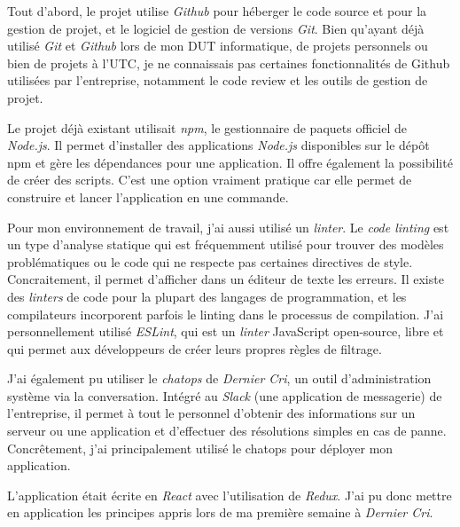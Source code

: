 \bigskip

Tout d'abord, le projet utilise \emph{Github} pour héberger le code
source et pour la gestion de projet, et le logiciel de gestion de
versions \emph{Git}. Bien qu'ayant déjà utilisé \emph{Git} et
\emph{Github} lors de mon DUT informatique, de projets personnels ou
bien de projets à l'UTC, je ne connaissais pas certaines fonctionnalités
de Github utilisées par l'entreprise, notamment le code review et les
outils de gestion de projet.

\bigskip

Le projet déjà existant utilisait \emph{npm}, le gestionnaire de paquets
officiel de \emph{Node.js}. Il permet d'installer des applications
\emph{Node.js} disponibles sur le dépôt npm et gère les dépendances pour
une application. Il offre également la possibilité de créer des scripts.
C'est une option vraiment pratique car elle permet de construire et
lancer l'application en une commande.

\bigskip

Pour mon environnement de travail, j'ai aussi utilisé un \emph{linter}.
Le \emph{code linting} est un type d'analyse statique qui est
fréquemment utilisé pour trouver des modèles problématiques ou le code
qui ne respecte pas certaines directives de style. Concraitement, il
permet d'afficher dans un éditeur de texte les erreurs. Il existe des
\emph{linters} de code pour la plupart des langages de programmation, et
les compilateurs incorporent parfois le linting dans le processus de
compilation. J'ai personnellement utilisé \emph{ESLint}, qui est un
\emph{linter} JavaScript open-source, libre et qui permet aux
développeurs de créer leurs propres règles de filtrage.

\bigskip

J'ai également pu utiliser le \emph{chatops} de \emph{Dernier Cri}, un
outil d'administration système via la conversation. Intégré au
\emph{Slack} (une application de messagerie) de l'entreprise, il permet
à tout le personnel d'obtenir des informations sur un serveur ou une
application et d'effectuer des résolutions simples en cas de panne.
Concrêtement, j'ai principalement utilisé le chatops pour déployer mon
application.

\bigskip

L'application était écrite en \emph{React} avec l'utilisation de
\emph{Redux}. J'ai pu donc mettre en application les principes appris
lors de ma première semaine à \emph{Dernier Cri}.

\bigskip

